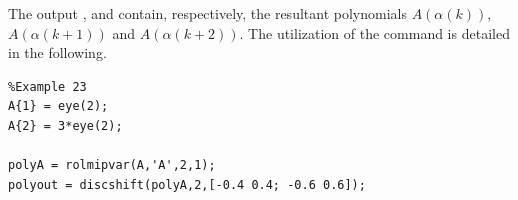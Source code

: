 \documentclass[english,11pt]{article}
\theoremstyle{break} \theorembodyfont{\small\rm}
\begin{document}
\vspace{0.5cm}%
\begin{minipage}{14.5cm}
\end{minipage}
\vspace{0.2cm}

The output ,  and  contain, respectively, the resultant polynomials
$A(\alpha(k))$, $A(\alpha(k+1))$ and $A(\alpha(k+2))$. The utilization of the  command is detailed in the following.

\begin{minipage}{12.5cm}
 \begin{lstlisting}
%Example 23
A{1} = eye(2);
A{2} = 3*eye(2);

polyA = rolmipvar(A,'A',2,1);
polyout = discshift(polyA,2,[-0.4 0.4; -0.6 0.6]);
 \end{lstlisting}
\end{minipage}
\vspace{0.2cm}
\end{document}
